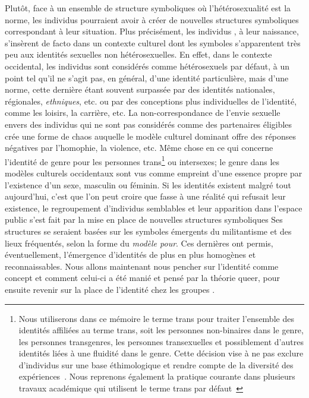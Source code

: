 Plutôt, face à un ensemble de structure symboliques où l'hétérosexualité est la norme, les individus \lgbt{} pourraient avoir à créer de nouvelles structures symboliques correspondant à leur situation.
Plus précisément, les individus \lgbt{}, à leur naissance, s'insèrent de facto dans un contexte culturel dont les symboles s'apparentent très peu aux identités sexuelles non hétérosexuelles.
En effet, dans le contexte occidental, les individus sont considérés comme hétérosexuels par défaut, à un point tel qu'il ne s'agit pas, en général, d'une identité particulière, mais d'une norme, cette dernière étant souvent surpassée par des identités nationales, régionales, \emph{ethniques}, etc. ou par des conceptions plus individuelles de l'identité, comme les loisirs, la carrière, etc.
La non-correspondance de l'envie sexuelle envers des individus qui ne sont pas considérés comme des partenaires éligibles crée une forme de chaos auquelle le modèle culturel dominant offre des réponses négatives par l'homophie, la violence, etc.
Même chose en ce qui concerne l'identité de genre pour les personnes trans\footnote{Nous utiliserons dans ce mémoire le terme trans pour traiter l'ensemble des identités affiliées au terme trans, soit les personnes non-binaires dans le genre, les personnes transgenres, les personnes transexuelles et possiblement d'autres identités liées à une fluidité dans le genre. Cette décision vise à ne pas exclure d'individus sur une base éthimologique et rendre compte de la diversité des expériences~\citep[193]{Nash2011}. Nous reprenons également la pratique courante dans plusieurs travaux académique qui utilisent le terme trans par défaut~\citep[par exemple, voir][]{Pfeffer2014, Rosenberg2014}} ou intersexes; le genre dans les modèles culturels occidentaux sont vus comme empreint d'une essence propre par l'existence d'un sexe, masculin ou féminin.
Si les identités \lgbt{} existent malgré tout aujourd'hui, c'est que l'on peut croire que fasse à une réalité qui refusait leur existence, le regroupement d'individus semblables et leur apparition dans l'espace public s'est fait par la mise en place de nouvelles structures symboliques
Ses structures se seraient basées sur les symboles émergents du militantisme et des lieux fréquentés, selon la forme du \emph{modèle pour}.
Ces dernières ont permis, éventuellement, l'émergence d'identités de plus en plus homogènes et reconnaissables.
Nous allons maintenant nous pencher sur l'identité comme concept et comment celui-ci a été manié et pensé par la théorie queer, pour ensuite revenir sur la place de l'identité chez les groupes \lgbt{}.

